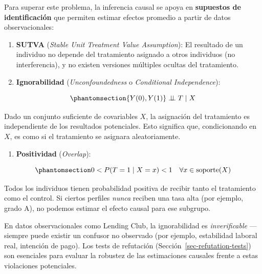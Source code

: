 \documentclass[
  spanish,
  11pt,
  letterpaper,
]{scrbook}
\providecommand{\tightlist}{%
  \setlength{\itemsep}{0pt}\setlength{\parskip}{0pt}}
\theoremstyle{plain}
\theoremstyle{remark}
\begin{document}
Para superar este problema, la inferencia causal se apoya en
\textbf{supuestos de identificación} que permiten estimar efectos
promedio a partir de datos observacionales:

\begin{enumerate}
\def\labelenumi{\arabic{enumi}.}
\item
  \textbf{SUTVA} (\emph{Stable Unit Treatment Value Assumption}): El
  resultado de un individuo no depende del tratamiento asignado a otros
  individuos (no interferencia), y no existen versiones múltiples
  ocultas del tratamiento.
\item
  \textbf{Ignorabilidad} (\emph{Unconfoundedness} o \emph{Conditional
  Independence}):
\end{enumerate}

\begin{equation}\protect\phantomsection\label{eq-unconfoundedness}{
\{Y(0), Y(1)\} \perp\!\!\!\perp T \mid X
}\end{equation}

Dado un conjunto suficiente de covariables \(X\), la asignación del
tratamiento es independiente de los resultados potenciales. Esto
significa que, condicionando en \(X\), es como si el tratamiento se
asignara aleatoriamente.

\begin{enumerate}
\def\labelenumi{\arabic{enumi}.}
\setcounter{enumi}{2}
\tightlist
\item
  \textbf{Positividad} (\emph{Overlap}):
\end{enumerate}

\begin{equation}\protect\phantomsection\label{eq-positivity}{
0 < P(T = 1 \mid X = x) < 1 \quad \forall x \in \text{soporte}(X)
}\end{equation}

Todos los individuos tienen probabilidad positiva de recibir tanto el
tratamiento como el control. Si ciertos perfiles \emph{nunca} reciben
una tasa alta (por ejemplo, grado A), no podemos estimar el efecto
causal para ese subgrupo.

\begin{tcolorbox}[enhanced jigsaw, arc=.35mm, bottomrule=.15mm, bottomtitle=1mm, breakable, colback=white, colbacktitle=quarto-callout-warning-color!10!white, colframe=quarto-callout-warning-color-frame, coltitle=black, left=2mm, leftrule=.75mm, opacityback=0, opacitybacktitle=0.6, rightrule=.15mm, title=\textcolor{quarto-callout-warning-color}{\faExclamationTriangle}\hspace{0.5em}{Violación de supuestos en datos de Lending Club}, titlerule=0mm, toprule=.15mm, toptitle=1mm]

En datos observacionales como Lending Club, la ignorabilidad es
\emph{inverificable} --- siempre puede existir un confusor no observado
(por ejemplo, estabilidad laboral real, intención de pago). Los tests de
refutación (Sección~\ref{sec-refutation-tests}) son esenciales para
evaluar la robustez de las estimaciones causales frente a estas
violaciones potenciales.

\end{tcolorbox}
\end{document}
